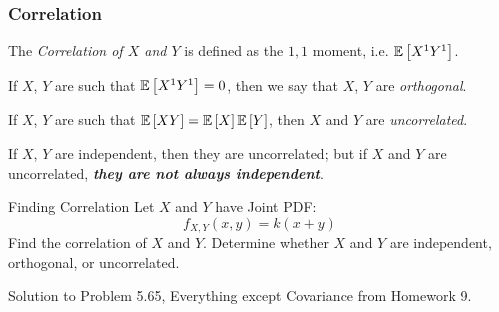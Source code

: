 		\subsubsection{Correlation} \label{subsubsec:Correlation}
			\begin{definition}[Correlation] \label{def:Correlation}
				The \emph{Correlation of $X$ and $Y$} is defined as the $1,1$ moment, i.e. $\operatorname{\operatorname{\mathbb{E}}} \left[ X^{1} Y^{1} \right]$.
				\begin{remark}
					If $X$, $Y$ are such that $\operatorname{\operatorname{\mathbb{E}}} \left[ X^{1} Y^{1} \right] = 0$, then we say that $X$, $Y$ are \emph{orthogonal}.
				\end{remark}
				\begin{remark}[Uncorrelated] \label{rmk:Uncorrelated}
					If $X$, $Y$ are such that $\operatorname{\operatorname{\mathbb{E}}} \left[ XY \right] = \operatorname{\operatorname{\mathbb{E}}} \left[ X \right] \operatorname{\operatorname{\mathbb{E}}} \left[ Y \right]$, then $X$ and $Y$ are \emph{uncorrelated}.
				\end{remark}
				\begin{remark}
					If $X$, $Y$ are independent, then they are uncorrelated; but if $X$ and $Y$ are uncorrelated, \emph{\textbf{they are not always independent}}.
				\end{remark}
			\end{definition}
			\begin{example}[Problem 5.65]{Finding Correlation}
                          Let $X$ and $Y$ have Joint PDF:
                          \begin{equation*}
                            f_{X,Y} \left( x,y \right) = k \left( x+y \right)
                          \end{equation*}
                          Find the correlation of $X$ and $Y$.
                          Determine whether $X$ and $Y$ are independent, orthogonal, or uncorrelated.

                          \tcblower

                          Solution to Problem 5.65, Everything except Covariance from Homework 9.
			\end{example}
